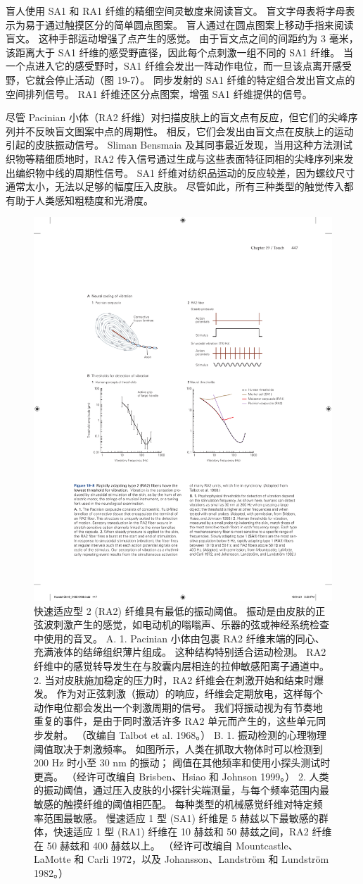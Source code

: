 盲人使用 SA1 和 RA1 纤维的精细空间灵敏度来阅读盲文。 盲文字母表将字母表示为易于通过触摸区分的简单圆点图案。 盲人通过在圆点图案上移动手指来阅读盲文。 这种手部运动增强了点产生的感觉。 由于盲文点之间的间距约为 3 毫米，该距离大于 SA1 纤维的感受野直径，因此每个点刺激一组不同的 SA1 纤维。 当一个点进入它的感受野时，SA1 纤维会发出一阵动作电位，而一旦该点离开感受野，它就会停止活动（图 19-7）。 同步发射的 SA1 纤维的特定组合发出盲文点的空间排列信号。 RA1 纤维还区分点图案，增强 SA1 纤维提供的信号。

尽管 Pacinian 小体（RA2 纤维）对扫描皮肤上的盲文点有反应，但它们的尖峰序列并不反映盲文图案中点的周期性。 相反，它们会发出由盲文点在皮肤上的运动引起的皮肤振动信号。 Sliman Bensmaia 及其同事最近发现，当用这种方法测试织物等精细质地时，RA2 传入信号通过生成与这些表面特征同相的尖峰序列来发出编织物中线的周期性信号。 SA1 纤维对纺织品运动的反应较差，因为螺纹尺寸通常太小，无法以足够的幅度压入皮肤。 尽管如此，所有三种类型的触觉传入都有助于人类感知粗糙度和光滑度。


\begin{figure}[htbp]
	\centering
	\includegraphics[width=0.5\linewidth]{chap19/fig_19_8}
	\caption{快速适应型 2 (RA2) 纤维具有最低的振动阈值。 
		振动是由皮肤的正弦波刺激产生的感觉，如电动机的嗡嗡声、乐器的弦或神经系统检查中使用的音叉。 
		A. 1. Pacinian 小体由包裹 RA2 纤维末端的同心、充满液体的结缔组织薄片组成。 这种结构特别适合运动检测。 
		RA2 纤维中的感觉转导发生在与胶囊内层相连的拉伸敏感阳离子通道中。 
		2. 当对皮肤施加稳定的压力时，RA2 纤维会在刺激开始和结束时爆发。 
		作为对正弦刺激（振动）的响应，纤维会定期放电，这样每个动作电位都会发出一个刺激周期的信号。 
		我们将振动视为有节奏地重复的事件，是由于同时激活许多 RA2 单元而产生的，这些单元同步发射。 （改编自 Talbot et al. 1968。） 
		B. 1. 振动检测的心理物理阈值取决于刺激频率。 
		如图所示，人类在抓取大物体时可以检测到 200 Hz 时小至 30 nm 的振动； 阈值在其他频率和使用小探头测试时更高。 （经许可改编自 Brisben、Hsiao 和 Johnson 1999。） 
		2. 人类的振动阈值，通过压入皮肤的小探针尖端测量，与每个频率范围内最敏感的触摸纤维的阈值相匹配。 
		每种类型的机械感觉纤维对特定频率范围最敏感。 
		慢速适应 1 型 (SA1) 纤维是 5 赫兹以下最敏感的群体，快速适应 1 型 (RA1) 纤维在 10 赫兹和 50 赫兹之间，RA2 纤维在 50 赫兹和 400 赫兹以上。 （经许可改编自 Mountcastle、LaMotte 和 Carli 1972，以及 Johansson、Landström 和 Lundström 1982。）}
	\label{fig:19_8}
\end{figure}



